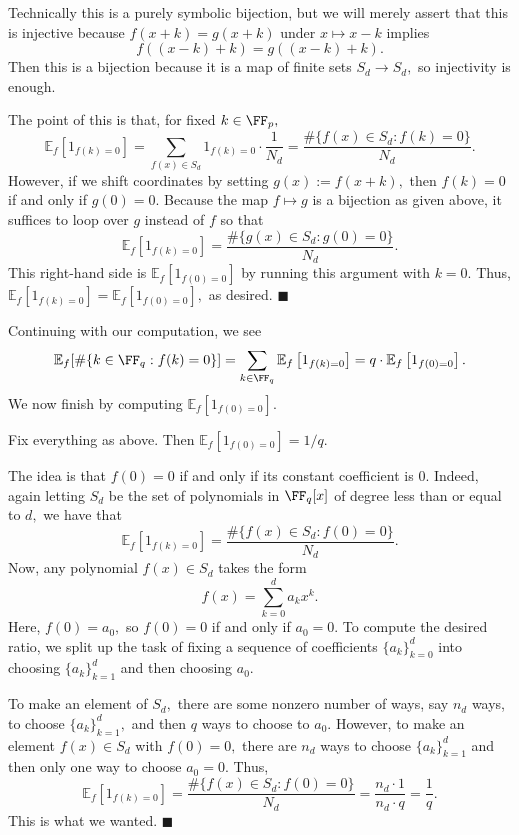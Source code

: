 Technically this is a purely symbolic bijection, but we will merely assert that this is injective because $f(x+k)=g(x+k)$ under $x\mapsto x-k$ implies
\[f((x-k)+k)=g((x-k)+k).\]
Then this is a bijection because it is a map of finite sets $S_d\to S_d,$ so injectivity is enough.

The point of this is that, for fixed $k\in\FF_p,$
\[\mathbb E_f\left[1_{f(k)=0}\right]=\sum_{f(x)\in S_d}1_{f(k)=0}\cdot\frac1{N_d}=\frac{\#\{f(x)\in S_d:f(k)=0\}}{N_d}.\]
However, if we shift coordinates by setting $g(x):=f(x+k),$ then $f(k)=0$ if and only if $g(0)=0.$ Because the map $f\mapsto g$ is a bijection as given above, it suffices to loop over $g$ instead of $f$ so that
\[\mathbb E_f\left[1_{f(k)=0}\right]=\frac{\#\{g(x)\in S_d:g(0)=0\}}{N_d}.\]
This right-hand side is $\mathbb E_f\left[1_{f(0)=0}\right]$ by running this argument with $k=0.$ Thus, $\mathbb E_f\left[1_{f(k)=0}\right]=\mathbb E_f\left[1_{f(0)=0}\right],$ as desired. $\blacksquare$

Continuing with our computation, we see
\[\mathbb E_f[\#\{k\in\FF_q:f(k)=0\}]=\sum_{k\in\FF_q}\mathbb E_f\left[1_{f(k)=0}\right]=q\cdot\mathbb E_f\left[1_{f(0)=0}\right].\]
We now finish by computing $\mathbb E_f\left[1_{f(0)=0}\right].$
\begin{lemma}
    Fix everything as above. Then $\mathbb E_f\left[1_{f(0)=0}\right]=1/q.$
\end{lemma}
The idea is that $f(0)=0$ if and only if its constant coefficient is $0.$ Indeed, again letting $S_d$ be the set of polynomials in $\FF_q[x]$ of degree less than or equal to $d,$ we have that
\[\mathbb E_f\left[1_{f(k)=0}\right]=\frac{\#\{f(x)\in S_d:f(0)=0\}}{N_d}.\]
Now, any polynomial $f(x)\in S_d$ takes the form
\[f(x)=\sum_{k=0}^da_kx^k.\]
Here, $f(0)=a_0,$ so $f(0)=0$ if and only if $a_0=0.$ To compute the desired ratio, we split up the task of fixing a sequence of coefficients $\{a_k\}_{k=0}^d$ into choosing $\{a_k\}_{k=1}^d$ and then choosing $a_0.$

To make an element of $S_d,$ there are some nonzero number of ways, say $n_d$ ways, to choose $\{a_k\}_{k=1}^d,$ and then $q$ ways to choose to $a_0.$ However, to make an element $f(x)\in S_d$ with $f(0)=0,$ there are $n_d$ ways to choose $\{a_k\}_{k=1}^d$ and then only one way to choose $a_0=0.$ Thus,
\[\mathbb E_f\left[1_{f(k)=0}\right]=\frac{\#\{f(x)\in S_d:f(0)=0\}}{N_d}=\frac{n_d\cdot1}{n_d\cdot q}=\frac1q.\]
This is what we wanted. $\blacksquare$

